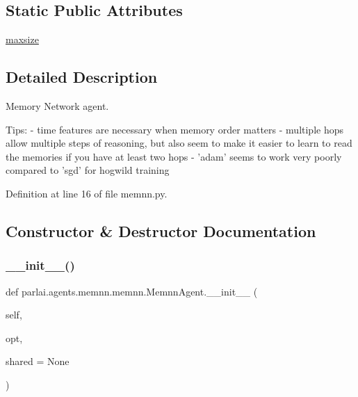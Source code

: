 \subsection*{Static Public Attributes}
\begin{DoxyCompactItemize}
\item 
\hyperlink{classparlai_1_1agents_1_1memnn_1_1memnn_1_1MemnnAgent_aff26270b3e93fc2c0a69a184774ec55e}{maxsize}
\end{DoxyCompactItemize}


\subsection{Detailed Description}
\begin{DoxyVerb}Memory Network agent.

Tips:
- time features are necessary when memory order matters
- multiple hops allow multiple steps of reasoning, but also seem to make it
    easier to learn to read the memories if you have at least two hops
- 'adam' seems to work very poorly compared to 'sgd' for hogwild training
\end{DoxyVerb}
 

Definition at line 16 of file memnn.\+py.



\subsection{Constructor \& Destructor Documentation}
\mbox{\label{classparlai_1_1agents_1_1memnn_1_1memnn_1_1MemnnAgent_a256f911504285d19b006def388d0772f}} 
\subsubsection{\texorpdfstring{\+\_\+\+\_\+init\+\_\+\+\_\+()}{\_\_init\_\_()}}
{\footnotesize\ttfamily def parlai.\+agents.\+memnn.\+memnn.\+Memnn\+Agent.\+\_\+\+\_\+init\+\_\+\+\_\+ (\begin{DoxyParamCaption}\item[{}]{self,  }\item[{}]{opt,  }\item[{}]{shared = {\ttfamily None} }\end{DoxyParamCaption})}



